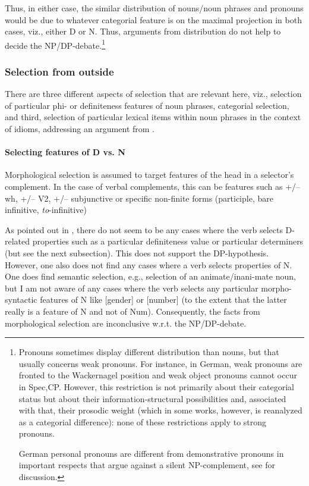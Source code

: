 \documentclass[output=paper,colorlinks,citecolor=black,
]{langscibook}
\begin{document}
 Thus, in either case, the similar distribution of nouns/noun phrases and pronouns would be due to whatever categorial feature is on the maximal projection in both cases, viz., either D or N. Thus, arguments from distribution do not help to decide the NP/DP-debate.\footnote{Pronouns sometimes display different distribution than nouns, but that usually concerns weak pronouns. For instance, in German, weak pronouns are fronted to the Wackernagel position and weak object pronouns cannot occur in Spec,CP. However, this restriction is not primarily about their categorial status but about their information-structural possibilities and, associated with that, their prosodic weight (which in some works, however, is reanalyzed as a categorial difference): none of these restrictions apply to strong pronouns. 
 
  German personal pronouns are different from demonstrative pronouns in important respects that argue against a silent NP-complement, see \citet[6, fn. 4]{Salzmann:2020:NP-DP} for discussion.}
 
 \subsubsection{Selection from outside}
 
 There are three different aspects of selection that are relevant here, viz., selection of particular phi- or definiteness features of noun phrases, categorial selection, and third, selection of particular lexical items within noun phrases in the context of idioms, addressing an argument from \citet{Bruening-et-al:2018:Selection-Idioms-NP}. 
 
 \paragraph{Selecting features of D vs. N}
 
  Morphological selection is assumed to target features of the head in a selector's complement. In the case of verbal complements, this can be features such as +/-- wh, +/-- V2, +/-- subjunctive or specific non-finite forms (participle, bare infinitive, \textit{to}-infinitive) 
  
 As pointed out in \citet{Bruening:2009:DP}, there do not seem to be any cases where the verb selects D-related properties such as a particular definiteness value or particular determiners (but see the next subsection). This does not support the DP-hypothesis. However, one also does not find any cases where a verb selects properties of N. One does find semantic selection, e.g., selection of an animate/inani-mate noun, but I am not aware of any cases where the verb selects any particular morpho-syntactic features of N like [gender] or [number] (to the extent that the latter really is a feature of N and not of Num). Consequently, the facts from morphological selection are inconclusive w.r.t. the NP/DP-debate.
 
\end{document}
